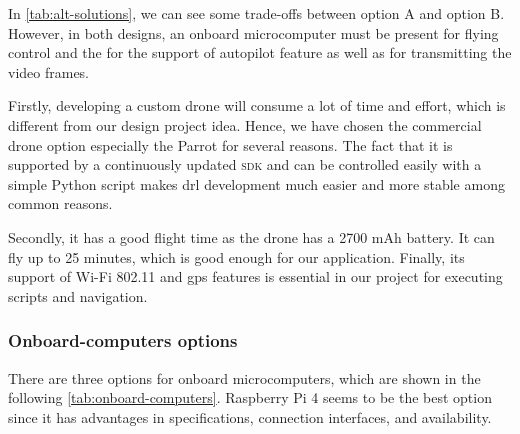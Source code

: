 \documentclass[../main.tex]{subfiles}
\begin{document}
In \cref{tab:alt-solutions}, 
we can see some trade-offs 
between option A and option B. However, in both designs, 
an onboard microcomputer must be present for 
flying control and the for the support of autopilot feature as well as for 
transmitting the video frames. 


Firstly, developing a custom drone will consume a lot of time and effort, 
which is different from our design project idea.
Hence, we have chosen the commercial drone option especially 
the Parrot \anafi for several reasons.
The fact that it is supported by a continuously updated 
\textsc{sdk} and can be controlled easily 
with a simple Python script makes 
\gls{drl} development much easier and more stable among common reasons.

Secondly, it has a good flight time 
as the \anafi drone has a 2700 mAh battery. 
It can fly up to 25 minutes, which is good enough 
for our application.
Finally, its support of Wi-Fi 802.11 and \gls{gps} 
features is essential in our project for 
executing scripts and navigation.

\subsubsection{Onboard-computers options}
There are three options for onboard microcomputers, 
which are shown in the following 
\cref{tab:onboard-computers}. Raspberry Pi 4 seems 
to be the best option since it has advantages 
in specifications, connection interfaces, 
and availability.
\end{document}

